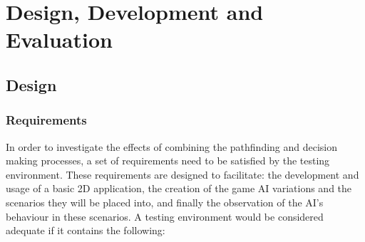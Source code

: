 \documentclass[11pt, a4paper]{report}
\begin{document}
\chapter{Design, Development and Evaluation}
\label{chapter:designDevelopmentAndEvaluation}

\section{Design}
\label{sec:design}

\subsection{Requirements}
\label{subsec:requirements}

In order to investigate the effects of combining the pathfinding and decision making processes, a set of requirements need to be satisfied by the testing environment. These requirements are designed to facilitate: the development and usage of a basic 2D application, the creation of the game AI variations and the scenarios they will be placed into, and finally the observation of the AI's behaviour in these scenarios. A testing environment would be considered adequate if it contains the following:
\end{document}
